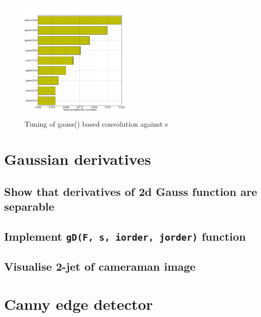 \documentclass[abstract=true]{scrartcl}
\begin{document}
            \begin{figure}
              \centering
              \includegraphics[width=0.5\textwidth]{../images/4_time_gauss1}
              \caption{Timing of gauss() based convolution against s}
              \label{timing2}
            \end{figure}


\section{Gaussian derivatives}

    \subsection{Show that derivatives of 2d Gauss function are separable}

    \subsection{Implement \texttt{gD(F, s, iorder, jorder)} function}

    \subsection{Visualise 2-jet of cameraman image}



\section{Canny edge detector}
\end{document}
